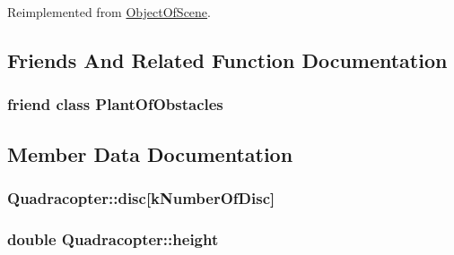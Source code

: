 Reimplemented from \hyperlink{class_object_of_scene_a79bbabdf7e17459475bf30856cf176aa}{Object\+Of\+Scene}.



\subsection{Friends And Related Function Documentation}
\subsubsection[{\texorpdfstring{Plant\+Of\+Obstacles}{PlantOfObstacles}}]{\setlength{\rightskip}{0pt plus 5cm}friend class {\bf Plant\+Of\+Obstacles}\hspace{0.3cm}{\ttfamily [friend]}}\hypertarget{class_quadracopter_a14d4091cd05171911dcf09b08d29bb30}{}\label{class_quadracopter_a14d4091cd05171911dcf09b08d29bb30}


\subsection{Member Data Documentation}
\subsubsection[{\texorpdfstring{disc}{disc}}]{ Quadracopter\+::disc\mbox{[}{\bf k\+Number\+Of\+Disc}\mbox{]}\hspace{0.3cm}{\ttfamily [private]}}\hypertarget{class_quadracopter_a51b2350b8ec3efc0906228595ffcecd1}{}\label{class_quadracopter_a51b2350b8ec3efc0906228595ffcecd1}
\subsubsection[{\texorpdfstring{height}{height}}]{\setlength{\rightskip}{0pt plus 5cm}double Quadracopter\+::height\hspace{0.3cm}{\ttfamily [private]}}\hypertarget{class_quadracopter_aebaeeec3692eeff5e6d51549e9eb0619}{}\label{class_quadracopter_aebaeeec3692eeff5e6d51549e9eb0619}
